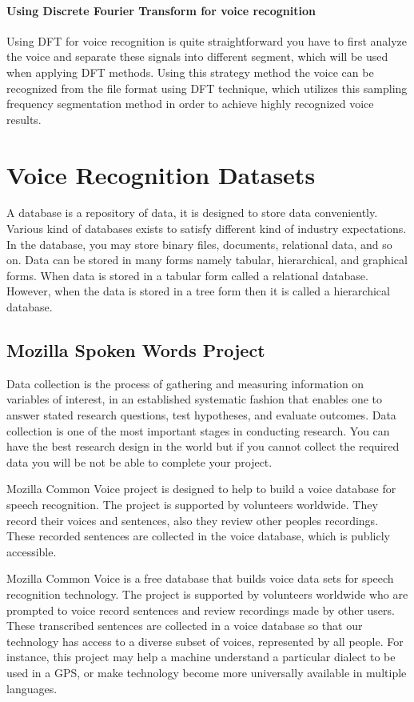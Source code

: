 \documentclass[english,12pt,oneside,a4paper]{article}
\begin{document}
		\paragraph{Using Discrete Fourier Transform for voice recognition}
		Using DFT for voice recognition is quite straightforward you have to first analyze the voice and separate these signals into different segment, which will be used when applying DFT methods. Using this strategy method the voice can be recognized from the file format using DFT technique, which utilizes this sampling frequency segmentation method in order to achieve highly recognized voice results.
		\section{Voice Recognition Datasets}
		
		A database is a repository of data, it is designed to store data conveniently. Various kind of databases exists to satisfy different kind of industry expectations. In the database, you may store binary files, documents, relational data, and so on. Data can be stored in many forms namely tabular, hierarchical, and graphical forms. When data is stored in a tabular form called a relational database. However, when the data is stored in a tree form then it is called a hierarchical database.
		
		\subsection{Mozilla Spoken Words Project}
		Data collection is the process of gathering and measuring information on variables of interest, in an established systematic fashion that enables one to answer stated research questions, test hypotheses, and evaluate outcomes.
		Data collection is one of the most important stages in conducting research. You can have the best research design in the world but if you cannot collect the required data you will be not be able to complete your project. 

		Mozilla Common Voice project is designed to help to build a voice database for speech recognition. The project is supported by volunteers worldwide. They record their voices and sentences, also they review other peoples recordings. These recorded sentences are collected in the voice database, which is publicly accessible.
	
		Mozilla Common Voice is a free database that builds voice data sets for speech recognition technology. The project is supported by volunteers worldwide who are prompted to voice record sentences and review recordings made by other users. These transcribed sentences are collected in a voice database so that our technology has access to a diverse subset of voices, represented by all people. For instance, this project may help a machine understand a particular dialect to be used in a GPS, or make technology become more universally available in multiple languages.
\end{document}
